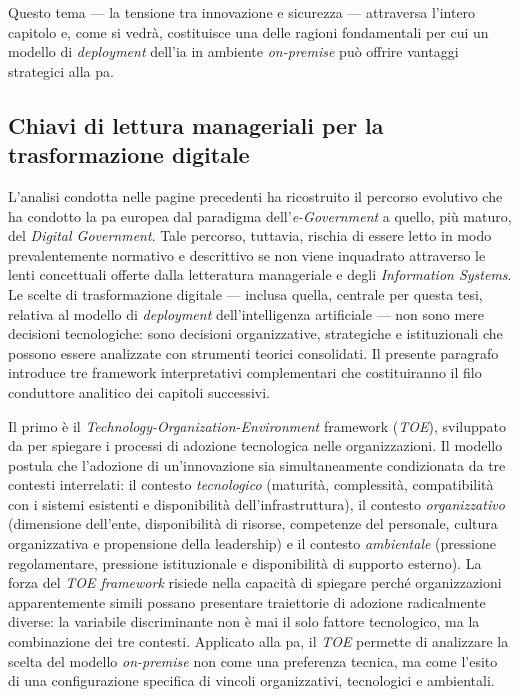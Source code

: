 Questo tema --- la tensione tra innovazione e sicurezza --- attraversa l'intero capitolo e, come si vedrà, costituisce una delle ragioni fondamentali per cui un modello di \textit{deployment} dell'\gls{ia} in ambiente \textit{on-premise} può offrire vantaggi strategici alla \gls{pa}.

\subsection{Chiavi di lettura manageriali per la trasformazione digitale}
\label{subsec:chiavi-manageriali}

L'analisi condotta nelle pagine precedenti ha ricostruito il percorso evolutivo che ha condotto la \gls{pa} europea dal paradigma dell'\textit{e-Government} a quello, più maturo, del \textit{Digital Government}. Tale percorso, tuttavia, rischia di essere letto in modo prevalentemente normativo e descrittivo se non viene inquadrato attraverso le lenti concettuali offerte dalla letteratura manageriale e degli \textit{Information Systems}. Le scelte di trasformazione digitale --- inclusa quella, centrale per questa tesi, relativa al modello di \textit{deployment} dell'intelligenza artificiale --- non sono mere decisioni tecnologiche: sono decisioni organizzative, strategiche e istituzionali che possono essere analizzate con strumenti teorici consolidati. Il presente paragrafo introduce tre framework interpretativi complementari che costituiranno il filo conduttore analitico dei capitoli successivi.

Il primo è il \textit{Technology-Organization-Environment} framework (\textit{TOE}), sviluppato da \textcite{TornatzkyFleischer1990} per spiegare i processi di adozione tecnologica nelle organizzazioni. Il modello postula che l'adozione di un'innovazione sia simultaneamente condizionata da tre contesti interrelati: il contesto \textit{tecnologico} (maturità, complessità, compatibilità con i sistemi esistenti e disponibilità dell'infrastruttura), il contesto \textit{organizzativo} (dimensione dell'ente, disponibilità di risorse, competenze del personale, cultura organizzativa e propensione della leadership) e il contesto \textit{ambientale} (pressione regolamentare, pressione istituzionale e disponibilità di supporto esterno). La forza del \textit{TOE framework} risiede nella capacità di spiegare perché organizzazioni apparentemente simili possano presentare traiettorie di adozione radicalmente diverse: la variabile discriminante non è mai il solo fattore tecnologico, ma la combinazione dei tre contesti. Applicato alla \gls{pa}, il \textit{TOE} permette di analizzare la scelta del modello \textit{on-premise} non come una preferenza tecnica, ma come l'esito di una configurazione specifica di vincoli organizzativi, tecnologici e ambientali.

